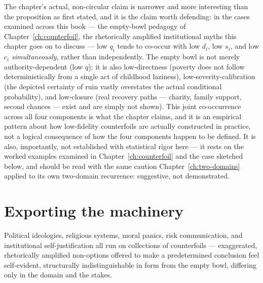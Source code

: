 The chapter's actual, non-circular claim is narrower and more interesting than the proposition as first stated, and it is the claim worth defending: in the cases examined across this book --- the empty-bowl pedagogy of Chapter~\ref{ch:counterfoil}, the rhetorically amplified institutional myths this chapter goes on to discuss --- low $q_i$ tends to co-occur with low $d_i$, low $s_i$, and low $c_i$ \emph{simultaneously}, rather than independently. The empty bowl is not merely authority-dependent (low $q$); it is also low-directness (poverty does not follow deterministically from a single act of childhood laziness), low-severity-calibration (the depicted certainty of ruin vastly overstates the actual conditional probability), and low-closure (real recovery paths --- charity, family support, second chances --- exist and are simply not shown). This joint co-occurrence across all four components is what the chapter claims, and it is an empirical pattern about how low-fidelity counterfoils are actually constructed in practice, not a logical consequence of how the four components happen to be defined. It is also, importantly, not established with statistical rigor here --- it rests on the worked examples examined in Chapter~\ref{ch:counterfoil} and the case sketched below, and should be read with the same caution Chapter~\ref{ch:two-domains} applied to its own two-domain recurrence: suggestive, not demonstrated.

\section{Exporting the machinery}

Political ideologies, religious systems, moral panics, risk communication, and institutional self-justification all run on collections of counterfoils --- exaggerated, rhetorically amplified non-options offered to make a predetermined conclusion feel self-evident, structurally indistinguishable in form from the empty bowl, differing only in the domain and the stakes.

